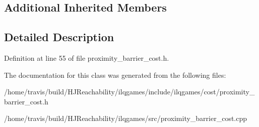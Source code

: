 \subsection*{Additional Inherited Members}


\subsection{Detailed Description}


Definition at line 55 of file proximity\+\_\+barrier\+\_\+cost.\+h.



The documentation for this class was generated from the following files\+:\begin{DoxyCompactItemize}
\item 
/home/travis/build/\+H\+J\+Reachability/ilqgames/include/ilqgames/cost/proximity\+\_\+barrier\+\_\+cost.\+h\item 
/home/travis/build/\+H\+J\+Reachability/ilqgames/src/proximity\+\_\+barrier\+\_\+cost.\+cpp\end{DoxyCompactItemize}
